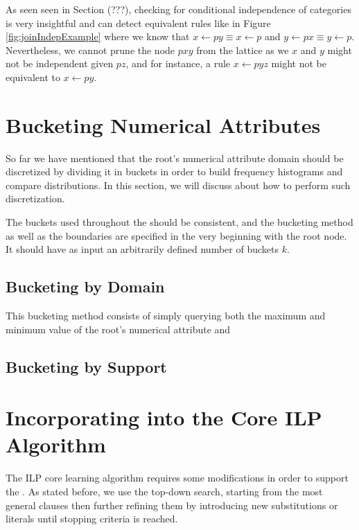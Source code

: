 


As seen seen in Section (???), checking for conditional independence of categories is very insightful and
can detect equivalent rules like in Figure \ref{fig:joinIndepExample} where we know that 
$x \leftarrow py \equiv x \leftarrow p$ and $y \leftarrow px \equiv y \leftarrow p$. Nevertheless, we cannot prune the
node $pxy$ from the lattice as we $x$ and $y$ might not be independent given $pz$, and for instance, a rule $x
\leftarrow pyz$ might not be equivalent to $x \leftarrow py$. 

\section{Bucketing Numerical Attributes}

So far we have mentioned that the root's numerical attribute domain should be discretized by dividing it in buckets in
order to build frequency histograms and compare distributions. In this section, we will discuss about how to perform
such discretization.

The buckets used throughout the \graphname should be consistent, and the bucketing method as well as the boundaries are
specified in the very beginning with the root node. It should have as input an arbitrarily defined number of buckets
$k$.

\subsection{Bucketing by Domain}
This bucketing method consists of simply querying both the maximum and minimum value of the root's numerical attribute
and 

\subsection{Bucketing by Support}


\section{Incorporating \graphname into the Core ILP Algorithm}

The ILP core learning algorithm requires some modifications in order to support the \graphname. As stated before, we use
the top-down search, starting from the most general clauses then further refining them by introducing new substitutions
or literals until stopping criteria is reached.

